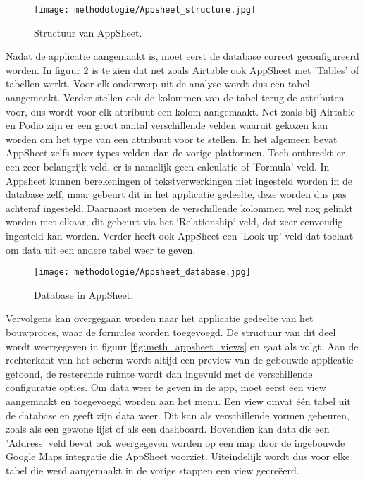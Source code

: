 \begin{figure}[h]
    \centering
    \texttt{[image: methodologie/Appsheet\_structure.jpg]}
    \caption{Structuur van AppSheet.}
    \label{fig:meth_appsheet_structuur}
\end{figure}

Nadat de applicatie aangemaakt is, moet eerst de database correct geconfigureerd worden. In figuur \ref{fig:meth_appsheet_database} is te zien dat net zoals Airtable ook AppSheet met 'Tables' of tabellen werkt. Voor elk onderwerp uit de analyse wordt dus een tabel aangemaakt. Verder stellen ook de kolommen van de tabel terug de attributen voor, dus wordt voor elk attribuut een kolom aangemaakt. Net zoals bij Airtable en Podio zijn er een groot aantal verschillende velden waaruit gekozen kan worden om het type van een attribuut voor te stellen. In het algemeen bevat AppSheet zelfs meer types velden dan de vorige platformen. Toch ontbreekt er een zeer belangrijk veld, er is namelijk geen calculatie of 'Formula' veld. In Appsheet kunnen berekeningen of tekstverwerkingen niet ingesteld worden in de database zelf, maar gebeurt dit in het applicatie gedeelte, deze worden dus pas achteraf ingesteld. Daarnaast moeten de verschillende kolommen wel nog gelinkt worden met elkaar, dit gebeurt via het `Relationship` veld, dat zeer eenvoudig ingesteld kan worden. Verder heeft ook AppSheet een 'Look-up' veld dat toelaat om data uit een andere tabel weer te geven.

\begin{figure}[h]
    \centering
    \texttt{[image: methodologie/Appsheet\_database.jpg]}
    \caption{Database in AppSheet.}
    \label{fig:meth_appsheet_database}
\end{figure}

Vervolgens kan overgegaan worden naar het applicatie gedeelte van het bouwproces, waar de formules worden toegevoegd. De structuur van dit deel wordt weergegeven in figuur \ref{fig:meth_appsheet_views} en gaat als volgt. Aan de rechterkant van het scherm wordt altijd een preview van de gebouwde applicatie getoond, de resterende ruimte wordt dan ingevuld met de verschillende configuratie opties. Om data weer te geven in de app, moet eerst een view aangemaakt en toegevoegd worden aan het menu. Een view omvat één tabel uit de database en geeft zijn data weer. Dit kan als verschillende vormen gebeuren, zoals als een gewone lijst of als een dashboard. Bovendien kan data die een 'Address' veld bevat ook weergegeven worden op een map door de ingebouwde Google Maps integratie die AppSheet voorziet. Uiteindelijk wordt dus voor elke tabel die werd aangemaakt in de vorige stappen een view gecreëerd. \\

